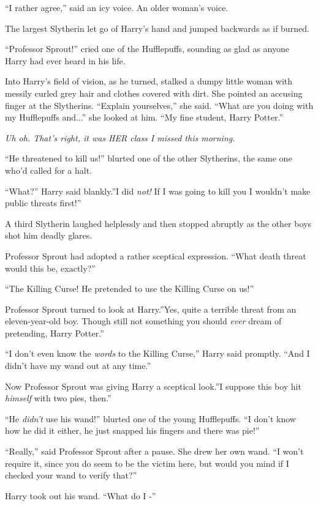 ``I rather agree,'' said an icy voice. An older woman's voice.

The largest Slytherin let go of Harry's hand and jumped backwards as if
burned.

``Professor Sprout!'' cried one of the Hufflepuffs, sounding as glad as
anyone Harry had ever heard in his life.

Into Harry's field of vision, as he turned, stalked a dumpy little woman
with messily curled grey hair and clothes covered with dirt. She pointed
an accusing finger at the Slytherins. ``Explain yourselves,'' she said.
``What are you doing with my Hufflepuffs and...'' she looked at
him. ``My fine student, Harry Potter.''

\emph{Uh oh. That's right, it was HER class I missed this morning.}

``He threatened to kill us!'' blurted one of the other Slytherins, the
same one who'd called for a halt.

``What?'' Harry said blankly.''I did \emph{not!} If I was going to kill
you I wouldn't make public threats first!''

A third Slytherin laughed helplessly and then stopped abruptly as the
other boys shot him deadly glares.

Professor Sprout had adopted a rather sceptical expression. ``What death
threat would this be, exactly?''

``The Killing Curse! He pretended to use the Killing Curse on us!''

Professor Sprout turned to look at Harry.''Yes, quite a terrible threat
from an eleven-year-old boy. Though still not something you should
\emph{ever} dream of pretending, Harry Potter.''

``I don't even know the \emph{words} to the Killing Curse,'' Harry said
promptly. ``And I didn't have my wand out at any time.''

Now Professor Sprout was giving Harry a sceptical look.''I suppose this
boy hit \emph{himself} with two pies, then.''

``He \emph{didn't} use his wand!'' blurted one of the young Hufflepuffs.
``I don't know how he did it either, he just snapped his fingers and
there was pie!''

``Really,'' said Professor Sprout after a pause. She drew her own wand.
``I won't require it, since you do seem to be the victim here, but would
you mind if I checked your wand to verify that?''

Harry took out his wand. ``What do I -''

